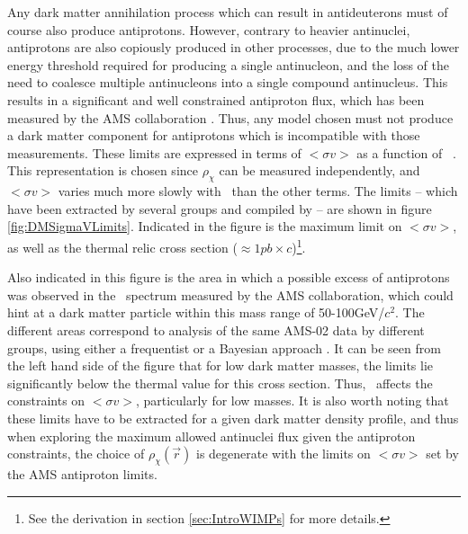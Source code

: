 Any dark matter annihilation process which can result in antideuterons must of course also produce antiprotons. However, contrary to heavier antinuclei, antiprotons are also copiously produced in other processes, due to the much lower energy threshold required for producing a single antinucleon, and the loss of the need to coalesce multiple antinucleons into a single compound antinucleus. This results in a significant and well constrained antiproton flux, which has been measured by the AMS collaboration \cite{AMS_pbar_systematics_discussion, AMS_pbar_interpretation1}. Thus, any model chosen must not produce a dark matter component for antiprotons which is incompatible with those measurements. These limits are expressed in terms of $<\sigma v>$ as a function of \dmm\ . This representation is chosen since $\rho_\chi$ can be measured independently, and $<\sigma v>$ varies much more slowly with \dmm\ than the other terms. The limits -- which have been extracted by several groups \cite{Cholis_19, Cui_2018, Cuoco_2019, Cuoco_2018} and compiled by \cite{Doetinchem_2020_review}-- are shown in figure \ref{fig:DMSigmaVLimits}. Indicated in the figure is the maximum limit on $<\sigma v>$, as well as the thermal relic cross section ($\approx 1pb \times c$)\footnote{See the derivation in section \ref{sec:IntroWIMPs} for more details.}. 

Also indicated in this figure is the area in which a possible excess of antiprotons was observed in the \pbar\ spectrum measured by the AMS collaboration, which could hint at a dark matter particle within this mass range of 50-100GeV/$c^2$. The different areas correspond to analysis of the same AMS-02 data by different groups, using either a frequentist or a Bayesian approach \cite{Doetinchem_2020_review}. It can be seen from the left hand side of the figure that for low dark matter masses, the limits lie significantly below the thermal value for this cross section. Thus, \dmm\ affects the constraints on  $<\sigma v>$, particularly for low masses. It is also worth noting that these limits have to be extracted for a given dark matter density profile, and thus when exploring the maximum allowed antinuclei flux given the antiproton constraints, the choice of $\rho_\chi(\vec{r})$ is degenerate with the limits on $<\sigma v>$ set by the AMS antiproton limits.\\

